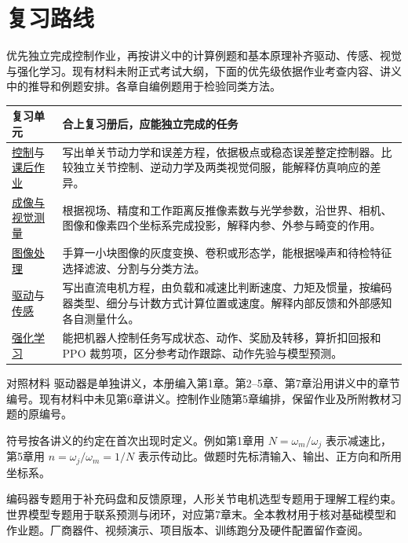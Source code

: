 \chapter*{复习路线}

优先独立完成控制作业，再按讲义中的计算例题和基本原理补齐驱动、传感、视觉与强化学习。现有材料未附正式考试大纲，下面的优先级依据作业考查内容、讲义中的推导和例题安排。各章自编例题用于检验同类方法。

\begin{center}
\small
\renewcommand{\arraystretch}{1.2}
\begin{tabularx}{\linewidth}{@{}p{2.55cm}X@{}}
\toprule
复习单元 & 合上复习册后，应能独立完成的任务 \\
\midrule
\hyperref[ch:robot-control]{控制}与\hyperref[hw:robot-control]{课后作业} & 写出单关节动力学和误差方程，依据极点或稳态误差整定控制器。比较独立关节控制、逆动力学及两类视觉伺服，能解释仿真响应的差异。 \\
\hyperref[chap:rii-image-formation]{成像与视觉测量} & 根据视场、精度和工作距离反推像素数与光学参数，沿世界、相机、图像和像素四个坐标系完成投影，解释内参、外参与畸变的作用。 \\
\hyperref[chap:rii-image-processing]{图像处理} & 手算一小块图像的灰度变换、卷积或形态学，能根据噪声和待检特征选择滤波、分割与分类方法。 \\
\hyperref[chap:actuators]{驱动}与\hyperref[chap:robot-sensing]{传感} & 写出直流电机方程，由负载和减速比判断速度、力矩及惯量，按编码器类型、细分与计数方式计算位置或速度。解释内部反馈和外部感知各自测量什么。 \\
\hyperref[chap:reinforcement-learning]{强化学习} & 能把机器人控制任务写成状态、动作、奖励及转移，算折扣回报和 PPO 裁剪项，区分参考动作跟踪、动作先验与模型预测。 \\
\bottomrule
\end{tabularx}
\end{center}

\begin{focusbox}{对照材料}
驱动器是单独讲义，本册编入第1章。第2--5章、第7章沿用讲义中的章节编号。现有材料中未见第6章讲义。控制作业随第5章编排，保留作业及所附教材习题的原编号。

符号按各讲义的约定在首次出现时定义。例如第1章用 $N=\omega_m/\omega_j$ 表示减速比，第5章用 $n=\omega_j/\omega_m=1/N$ 表示传动比。做题时先标清输入、输出、正方向和所用坐标系。

编码器专题用于补充码盘和反馈原理，人形关节电机选型专题用于理解工程约束。世界模型专题用于联系预测与闭环，对应第7章末。全本教材用于核对基础模型和作业题。厂商器件、视频演示、项目版本、训练跑分及硬件配置留作查阅。
\end{focusbox}
